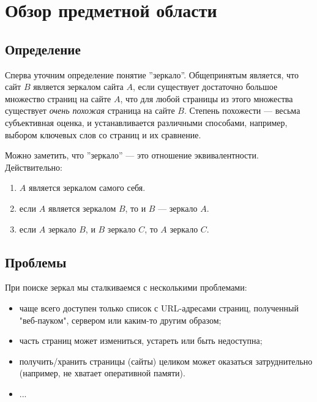 \section{Обзор предметной области}
\subsection{Определение}
Сперва уточним определение понятие ''зеркало''. Общепринятым является, что сайт
$B$ является зеркалом сайта $A$, если существует достаточно большое множество
страниц на сайте $A$, что для любой страницы из этого множества существует
\textit{очень похожая} страница на сайте $B$. Степень похожести — весьма
субъективная оценка, и устанавливается различными способами, например, выбором
ключевых слов со страниц и их сравнение.

Можно заметить, что ''зеркало'' — это отношение эквивалентности. Действительно:
\begin{enumerate}
\item $A$ является зеркалом самого себя.
\item если $A$ является зеркалом $B$, то и $B$ — зеркало $A$.
\item если $A$ зеркало $B$, и $B$ зеркало $C$, то $A$ зеркало $C$.
\end{enumerate}

\subsection{Проблемы}
При поиске зеркал мы сталкиваемся с несколькими проблемами:
\begin{itemize}
\item чаще всего доступен только список с URL-адресами страниц, полученный "веб-пауком", сервером или каким-то другим образом;
\item часть страниц может измениться, устареть или быть недоступна;
\item получить/хранить страницы (сайты) целиком может оказаться затруднительно (например, не хватает оперативной памяти).
\item ...
\end{itemize}

